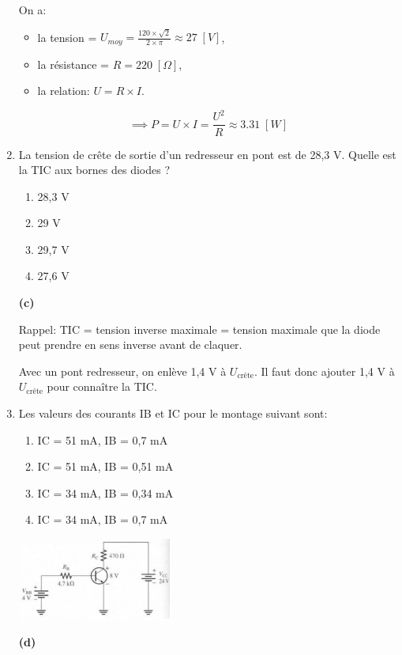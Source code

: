 \documentclass[a4paper]{article}
\begin{document}
\begin{enumerate}
\begin{example}
    On a:
    \begin{itemize}
        \item la tension = $\displaystyle U_{moy} = \frac{120 \times \sqrt{2}}{2 \times \pi} \approx 27 \; [V] $,
        \item la résistance = $ R = 220 \; [\Omega] $,
        \item la relation: $ U = R \times I $.
    \end{itemize}
    \[ \implies P = U \times I = \frac{U^2}{R} \approx 3.31 \; [W] \]
\end{example}





\item La tension de crête de sortie d’un redresseur en pont est de 28,3 V. Quelle est la TIC aux bornes des diodes ?
\begin{enumerate}
    \item 28,3 V
    \item 29 V
    \item 29,7 V
    \item 27,6 V
\end{enumerate}
\begin{example}
    \textbf{(c)}

    Rappel: TIC = tension inverse maximale = tension maximale que la diode peut prendre en sens inverse avant de claquer.

    Avec un pont redresseur, on enlève 1,4 V à $ U_{\text{crête}} $. Il faut donc ajouter 1,4 V à $ U_{\text{crête}} $ pour connaître la TIC.
\end{example}





\item Les valeurs des courants IB et IC pour le montage suivant sont:
\begin{enumerate}
    \item IC = 51 mA, IB = 0,7 mA
    \item IC = 51 mA, IB = 0,51 mA
    \item IC = 34 mA, IB = 0,34 mA
    \item IC = 34 mA, IB = 0,7 mA
\end{enumerate}
\begin{center}
    \includegraphics[width=0.4\textwidth]{images/interro1-ex9-1.PNG}
\end{center}
\begin{example}
    \textbf{(d)}


\end{example}
\end{enumerate}
\end{document}
